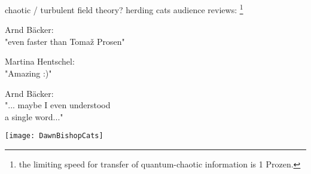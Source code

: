 \begin{frame}
  \titlepage
\end{frame} %

%

\begin{frame}{chaotic / turbulent field theory?}
herding cats audience reviews:%
\footnote{the limiting speed for transfer of quantum-chaotic information is 1 Prozen.}
\begin{center}
  \begin{minipage}[b]{0.42\textwidth}

\bigskip
Arnd B\"acker: \\ {\footnotesize "even faster than Toma\v{z} Prosen"}

\bigskip
Martina Hentschel: \\ {\footnotesize "Amazing :)"}

\bigskip
Arnd B\"acker: \\ {\footnotesize "... maybe  I even understood \\ a single word..."}
  \end{minipage}
\qquad\quad
  \begin{minipage}[b]{0.46\textwidth}\hfill
\texttt{[image: DawnBishopCats]}
  \end{minipage}
\end{center}
\end{frame} %


%


